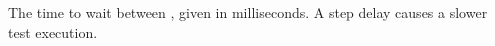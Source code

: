 \item[Step Delay]{
The time to wait between \gdsteps, given in milliseconds.
A step delay causes a slower test execution.
}
